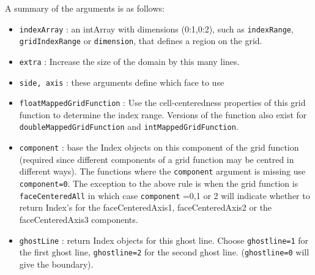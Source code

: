 \noindent A summary of the arguments is as follows:
\begin{itemize}
  \item {\tt indexArray} : an intArray with dimensions (0:1,0:2), such as
        {\tt indexRange}, {\tt gridIndexRange} or {\tt dimension}, that defines
        a region on the grid.
  \item {\tt extra} :  Increase the size of the domain by this many lines. 
  \item {\tt side, axis} : these arguments define which face to use
  \item {\tt floatMappedGridFunction} : Use the cell-centeredness properties of this grid function 
     to determine the index range. Versions of the function also exist for
    {\tt doubleMappedGridFunction} and {\tt intMappedGridFunction}. 
  \item {\tt component} : base the Index objects on this component of
    the grid function (required since different components of a grid function may be centred in
    different ways). The functions where the {\tt component} argument is missing use {\tt component=0}.
    The exception to the above rule is when the grid function 
    is {\tt faceCenteredAll} in which case {\tt component} =0,1 or 2 will indicate whether to return
   Index's for the faceCenteredAxis1, faceCenteredAxis2 or the faceCenteredAxis3 components.
  \item {\tt ghostLine} : return Index objects for this ghost line. Choose
    {\tt ghostline=1} for the first ghost line, {\tt ghostline=2} for the
    second ghost line. ({\tt ghostline=0} will give the boundary).
\end{itemize}

\newlength{\OGgetIndexIncludeArgIndent}



